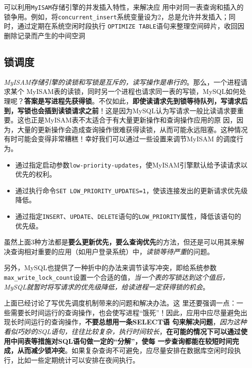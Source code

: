 \documentclass[UTF8,a4paper,12pt]{ctexbook}
\begin{document}
			
			可以利用\verb|MyISAM|存储引擎的并发插入特性，来解决应 用中对同一表查询和插入的锁争用。例如，将\verb|concurrent_insert|系统变量设为2，总是允许并发插入；同时，通过定期在系统空闲时段执行 \verb|OPTIMIZE TABLE|语句来整理空间碎片，收回因删除记录而产生的中间空洞
			
		\subsection{锁调度}
			\textit{MyISAM存储引擎的读锁和写锁是互斥的，读写操作是串行的}。那么，一个进程请求某个 MyISAM表的读锁，同时另一个进程也请求同一表的写锁，MySQL如何处理呢？\textbf{答案是写进程先获得锁}。不仅如此，\textbf{即使读请求先到锁等待队列，写请求后 到，写锁也会插到读锁请求之前}！这是因为MySQL认为写请求一般比读请求要重要。这也正是MyISAM表不太适合于有大量更新操作和查询操作应用的原 因，因为，大量的更新操作会造成查询操作很难获得读锁，从而可能永远阻塞。这种情况有时可能会变得非常糟糕！幸好我们可以通过一些设置来调节MyISAM 的调度行为。
		
			\begin{itemize}
				\item 通过指定启动参数\verb|low-priority-updates|，使MyISAM引擎默认给予读请求以优先的权利。
				\item 通过执行命令\verb|SET LOW_PRIORITY_UPDATES=1|，使该连接发出的更新请求优先级降低。
				\item 通过指定\verb|INSERT|、\verb|UPDATE|、\verb|DELETE|语句的\verb|LOW_PRIORITY|属性，降低该语句的优先级。
			\end{itemize}
			
			虽然上面3种方法都是\textbf{要么更新优先，要么查询优先}的方法，但还是可以用其来解决查询相对重要的应用（如用户登录系统）中，\textit{读锁等待严重}的问题。
			 
			另外，MySQL也提供了一种折中的办法来调节读写冲突，即给系统参数\verb|max_write_lock_count|设置一个合适的值，\textit{当一个表的写锁达到这个值后，MySQL就暂时将写请求的优先级降低，给读进程一定获得锁的机会}。
			
			上面已经讨论了写优先调度机制带来的问题和解决办法。这 里还要强调一点：一些需要长时间运行的查询操作，也会使写进程“饿死”！因此，应用中应尽量避免出现长时间运行的查询操作，\textbf{不要总想用一条SELECT语 句来解决问题}，\textit{因为这种看似巧妙的SQL语句，往往比较复杂，执行时间较长}，\textbf{在可能的情况下可以通过使用中间表等措施对SQL语句做一定的“分解”，使每 一步查询都能在较短时间完成，从而减少锁冲突}。如果复杂查询不可避免，应尽量安排在数据库空闲时段执行，比如一些定期统计可以安排在夜间执行。
			
\end{document}

